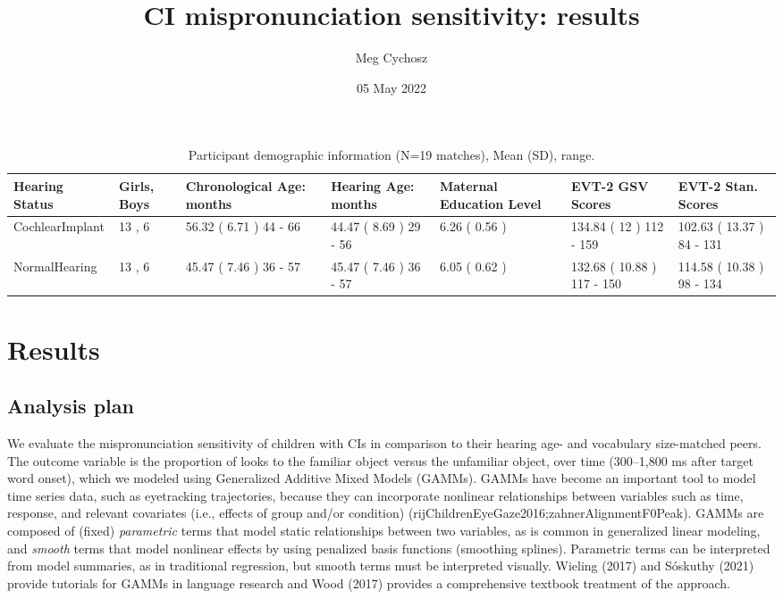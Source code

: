 \documentclass[
]{article}
\title{CI mispronunciation sensitivity: results}
\author{Meg Cychosz}
\date{05 May 2022}
\begin{document}
\maketitle

\begin{table}[!h]

\caption{\label{tab:demo-tab}Participant demographic information (N=19 matches), Mean (SD), range.}
\centering
\begin{tabular}[t]{lllllll}
\toprule
Hearing Status & Girls, Boys & Chronological Age: months & Hearing Age: months & Maternal Education Level & EVT-2 GSV Scores & EVT-2 Stan. Scores\\
\midrule
CochlearImplant & 13 , 6 & 56.32 ( 6.71 ) 44 - 66 & 44.47 ( 8.69 ) 29 - 56 & 6.26 ( 0.56 ) & 134.84 ( 12 ) 112 - 159 & 102.63 ( 13.37 ) 84 - 131\\
NormalHearing & 13 , 6 & 45.47 ( 7.46 ) 36 - 57 & 45.47 ( 7.46 ) 36 - 57 & 6.05 ( 0.62 ) & 132.68 ( 10.88 ) 117 - 150 & 114.58 ( 10.38 ) 98 - 134\\
\bottomrule
\end{tabular}
\end{table}

\hypertarget{results}{%
\section{Results}\label{results}}

\hypertarget{analysis-plan}{%
\subsection{Analysis plan}\label{analysis-plan}}

We evaluate the mispronunciation sensitivity of children with CIs in comparison to their hearing age- and vocabulary size-matched peers. The outcome variable is the proportion of looks to the familiar object versus the unfamiliar object, over time (300--1,800 ms after target word onset), which we modeled using Generalized Additive Mixed Models (GAMMs). GAMMs have become an important tool to model time series data, such as eyetracking trajectories, because they can incorporate nonlinear relationships between variables such as time, response, and relevant covariates (i.e., effects of group and/or condition) (rijChildrenEyeGaze2016;zahnerAlignmentF0Peak). GAMMs are composed of (fixed) \emph{parametric} terms that model static relationships between two variables, as is common in generalized linear modeling, and \emph{smooth} terms that model nonlinear effects by using penalized basis functions (smoothing splines). Parametric terms can be interpreted from model summaries, as in traditional regression, but smooth terms must be interpreted visually. Wieling (2017) and Sóskuthy (2021) provide tutorials for GAMMs in language research and Wood (2017) provides a comprehensive textbook treatment of the approach.
\end{document}

